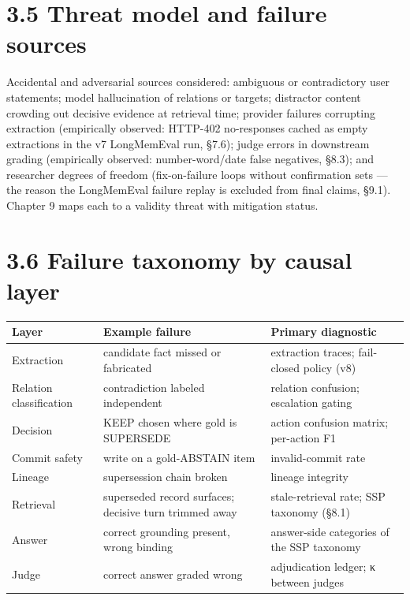 \section{3.5 Threat model and failure
sources}\label{threat-model-and-failure-sources}

Accidental and adversarial sources considered: ambiguous or
contradictory user statements; model hallucination of relations or
targets; distractor content crowding out decisive evidence at retrieval
time; provider failures corrupting extraction (empirically observed:
HTTP-402 no-responses cached as empty extractions in the v7 LongMemEval
run, §7.6); judge errors in downstream grading (empirically observed:
number-word/date false negatives, §8.3); and researcher degrees of
freedom (fix-on-failure loops without confirmation sets --- the reason
the LongMemEval failure replay is excluded from final claims, §9.1).
Chapter 9 maps each to a validity threat with mitigation status.

\section{3.6 Failure taxonomy by causal
layer}\label{failure-taxonomy-by-causal-layer}

{\def\LTcaptype{none} %
\begin{longtable}[]{@{}
  >{\raggedright\arraybackslash}p{}
  >{\raggedright\arraybackslash}p{}
  >{\raggedright\arraybackslash}p{}@{}}
\toprule\noalign{}
\begin{minipage}[b]{\linewidth}\raggedright
Layer
\end{minipage} & \begin{minipage}[b]{\linewidth}\raggedright
Example failure
\end{minipage} & \begin{minipage}[b]{\linewidth}\raggedright
Primary diagnostic
\end{minipage} \\
\midrule\noalign{}
\endhead
\bottomrule\noalign{}
\endlastfoot
Extraction & candidate fact missed or fabricated & extraction traces;
fail-closed policy (v8) \\
Relation classification & contradiction labeled independent & relation
confusion; escalation gating \\
Decision & KEEP chosen where gold is SUPERSEDE & action confusion
matrix; per-action F1 \\
Commit safety & write on a gold-ABSTAIN item & invalid-commit rate \\
Lineage & supersession chain broken & lineage integrity \\
Retrieval & superseded record surfaces; decisive turn trimmed away &
stale-retrieval rate; SSP taxonomy (§8.1) \\
Answer & correct grounding present, wrong binding & answer-side
categories of the SSP taxonomy \\
Judge & correct answer graded wrong & adjudication ledger; κ between
judges \\
\end{longtable}
}
